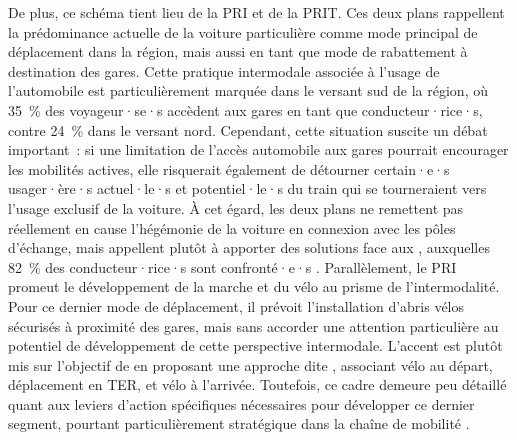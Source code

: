 \begin{refsegment}
De plus, ce schéma tient lieu de la \acrfull{PRI} et de la \acrfull{PRIT}. Ces deux plans rappellent la prédominance actuelle de la voiture particulière comme mode principal de déplacement dans la région, mais aussi en tant que mode de rabattement à destination des gares. Cette pratique intermodale associée à l'usage de l'automobile est particulièrement marquée dans le versant sud de la région, où 35~\% des voyageur·se·s accèdent aux gares en tant que conducteur·rice·s, contre 24~\% dans le versant nord. Cependant, cette situation suscite un débat important~: si une limitation de l’accès automobile aux gares pourrait encourager les mobilités actives, elle risquerait également de détourner certain·e·s usager·ère·s actuel·le·s et potentiel·le·s du train qui se tourneraient vers l’usage exclusif de la voiture. À cet égard, les deux plans ne remettent pas réellement en cause l'hégémonie de la voiture en connexion avec les pôles d'échange, mais appellent plutôt à apporter des solutions face aux , auxquelles 82~\% des conducteur·rice·s sont confronté·e·s \textcolor{blue}{\autocite[46]{region_hauts-de-france_planification_2024}}. Parallèlement, le \acrshort{PRI} promeut le développement de la marche et du vélo au prisme de l'intermodalité. Pour ce dernier mode de déplacement, il prévoit l’installation d’abris vélos sécurisés à proximité des gares, mais sans accorder une attention particulière au potentiel de développement de cette perspective intermodale. L’accent est plutôt mis sur l’objectif de  en proposant une approche dite , associant vélo au départ, \gls{déplacement} en \acrshort{TER}, et vélo à l’arrivée. Toutefois, ce cadre demeure peu détaillé quant aux leviers d’action spécifiques nécessaires pour développer ce dernier segment, pourtant particulièrement stratégique dans la chaîne de mobilité \textcolor{blue}{\autocite[37]{region_hauts-de-france_planification_2024}}.%


\end{refsegment}
